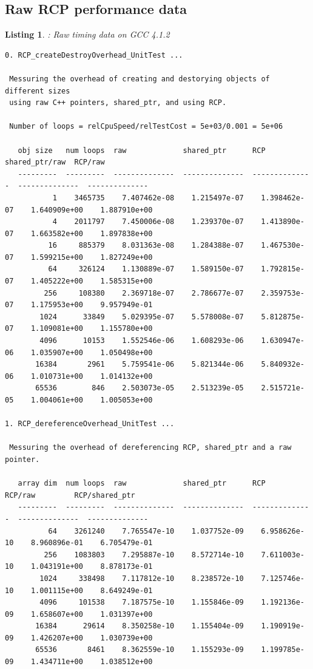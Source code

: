 \documentclass[pdf,ps2pdf,11pt]{SANDreport}
\newtheorem{listing}{Listing}
\begin{document}
%
{}\subsection{Raw RCP performance data}
\label{apdx:raw-rcp-perf-data}
%

\begin{listing}: Raw {} timing data on GCC 4.1.2  \\
\label{listing:RCP-GCC-Timings}
{\scriptsize\begin{verbatim}
0. RCP_createDestroyOverhead_UnitTest ... 
 
 Messuring the overhead of creating and destorying objects of different sizes
 using raw C++ pointers, shared_ptr, and using RCP.
 
 Number of loops = relCpuSpeed/relTestCost = 5e+03/0.001 = 5e+06
 
   obj size   num loops  raw             shared_ptr      RCP             shared_ptr/raw  RCP/raw       
   ---------  ---------  --------------  --------------  --------------  --------------  --------------
           1    3465735    7.407462e-08    1.215497e-07    1.398462e-07    1.640909e+00    1.887910e+00
           4    2011797    7.450006e-08    1.239370e-07    1.413890e-07    1.663582e+00    1.897838e+00
          16     885379    8.031363e-08    1.284388e-07    1.467530e-07    1.599215e+00    1.827249e+00
          64     326124    1.130889e-07    1.589150e-07    1.792815e-07    1.405222e+00    1.585315e+00
         256     108380    2.369718e-07    2.786677e-07    2.359753e-07    1.175953e+00    9.957949e-01
        1024      33849    5.029395e-07    5.578008e-07    5.812875e-07    1.109081e+00    1.155780e+00
        4096      10153    1.552546e-06    1.608293e-06    1.630947e-06    1.035907e+00    1.050498e+00
       16384       2961    5.759541e-06    5.821344e-06    5.840932e-06    1.010731e+00    1.014132e+00
       65536        846    2.503073e-05    2.513239e-05    2.515721e-05    1.004061e+00    1.005053e+00

1. RCP_dereferenceOverhead_UnitTest ... 
 
 Messuring the overhead of dereferencing RCP, shared_ptr and a raw pointer.
 
   array dim  num loops  raw             shared_ptr      RCP             RCP/raw         RCP/shared_ptr
   ---------  ---------  --------------  --------------  --------------  --------------  --------------
          64    3261240    7.765547e-10    1.037752e-09    6.958626e-10    8.960896e-01    6.705479e-01
         256    1083803    7.295887e-10    8.572714e-10    7.611003e-10    1.043191e+00    8.878173e-01
        1024     338498    7.117812e-10    8.238572e-10    7.125746e-10    1.001115e+00    8.649249e-01
        4096     101538    7.187575e-10    1.155846e-09    1.192136e-09    1.658607e+00    1.031397e+00
       16384      29614    8.350258e-10    1.155404e-09    1.190919e-09    1.426207e+00    1.030739e+00
       65536       8461    8.362559e-10    1.155293e-09    1.199785e-09    1.434711e+00    1.038512e+00


\end{verbatim}}
\end{listing}
\end{document}
